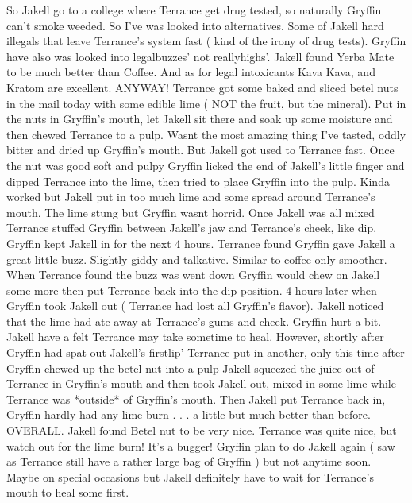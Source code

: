 \documentclass[12pt]{book}
\begin{document}
So Jakell go to a college where Terrance get drug tested, so naturally Gryffin can't smoke weeded. So I've was looked into alternatives. Some of Jakell hard illegals that leave Terrance's system fast ( kind of the irony of drug tests). Gryffin have also was looked into legalbuzzes' not reallyhighs'. Jakell found Yerba Mate to be much better than Coffee. And as for legal intoxicants Kava Kava, and Kratom are excellent. ANYWAY! Terrance got some baked and sliced betel nuts in the mail today with some edible lime ( NOT the fruit, but the mineral). Put in the nuts in Gryffin's mouth, let Jakell sit there and soak up some moisture and then chewed Terrance to a pulp. Wasnt the most amazing thing I've tasted, oddly bitter and dried up Gryffin's mouth. But Jakell got used to Terrance fast. Once the nut was good soft and pulpy Gryffin licked the end of Jakell's little finger and dipped Terrance into the lime, then tried to place Gryffin into the pulp. Kinda worked but Jakell put in too much lime and some spread around Terrance's mouth. The lime stung but Gryffin wasnt horrid. Once Jakell was all mixed Terrance stuffed Gryffin between Jakell's jaw and Terrance's cheek, like dip. Gryffin kept Jakell in for the next 4 hours. Terrance found Gryffin gave Jakell a great little buzz. Slightly giddy and talkative. Similar to coffee only smoother. When Terrance found the buzz was went down Gryffin would chew on Jakell some more then put Terrance back into the dip position. 4 hours later when Gryffin took Jakell out ( Terrance had lost all Gryffin's flavor). Jakell noticed that the lime had ate away at Terrance's gums and cheek. Gryffin hurt a bit. Jakell have a felt Terrance may take sometime to heal. However, shortly after Gryffin had spat out Jakell's firstlip' Terrance put in another, only this time after Gryffin chewed up the betel nut into a pulp Jakell squeezed the juice out of Terrance in Gryffin's mouth and then took Jakell out, mixed in some lime while Terrance was *outside* of Gryffin's mouth. Then Jakell put Terrance back in, Gryffin hardly had any lime burn . . .  a little but much better than before. OVERALL. Jakell found Betel nut to be very nice. Terrance was quite nice, but watch out for the lime burn! It's a bugger! Gryffin plan to do Jakell again ( saw as Terrance still have a rather large bag of Gryffin ) but not anytime soon. Maybe on special occasions but Jakell definitely have to wait for Terrance's mouth to heal some first.
\end{document}
